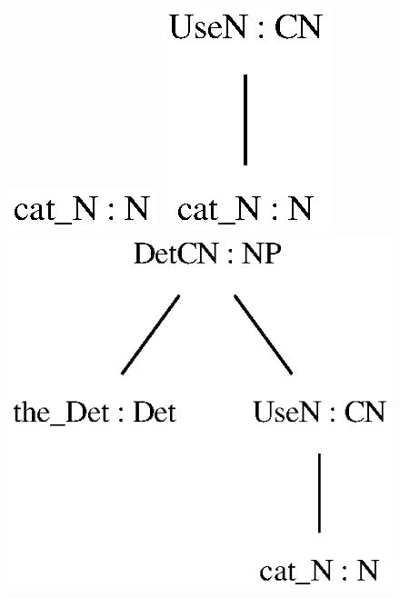 \begin{figure}[H]
    \centering
        {\includegraphics[scale=0.75]{thesis/figure/black_cats/cat_N_gf.eps}}
        {\includegraphics[scale=0.75]{thesis/figure/black_cats/cat_CN_gf.eps}}
        {\includegraphics[scale=0.75]{thesis/figure/black_cats/the_cat_NP_gf.eps}}

\end{figure}
